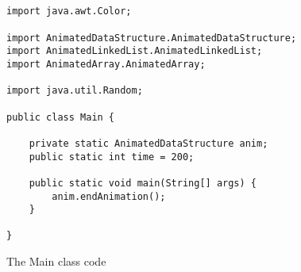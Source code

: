 \begin{figure}
\begin{center}
\begin{verbatim}


import java.awt.Color;

import AnimatedDataStructure.AnimatedDataStructure;
import AnimatedLinkedList.AnimatedLinkedList;
import AnimatedArray.AnimatedArray;

import java.util.Random;

public class Main {
    
    private static AnimatedDataStructure anim;
    public static int time = 200;
    
	public static void main(String[] args) {
        anim.endAnimation();
	}
	
}

\end{verbatim}
\end{center}
\caption{The Main class code}
\label{fig:main}
\end{figure}